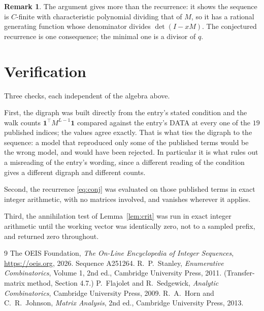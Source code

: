 \documentclass[11pt,a4paper]{article}
\theoremstyle{plain}
\theoremstyle{definition}
\newtheorem{remark}[theorem]{Remark}
\begin{document}
\begin{remark}
The argument gives more than the recurrence: it shows the sequence is $C$-finite with
characteristic polynomial dividing that of $M$, so it has a rational generating function
whose denominator divides $\det(I-xM)$. The conjectured recurrence is one consequence; the
minimal one is a divisor of $q$.
\end{remark}

\section{Verification}

Three checks, each independent of the algebra above.

First, the digraph was built directly from the entry's stated condition and the walk counts
$\mathbf{1}^{\!\top}M^{L-1}\mathbf{1}$ compared against the entry's DATA at
every one of the $19$ published indices; the values agree exactly. That is what ties
the digraph to the sequence: a model that reproduced only some of the published terms would
be the wrong model, and would have been rejected. In particular it is what rules out a
misreading of the entry's wording, since a different reading of the condition gives a
different digraph and different counts.

Second, the recurrence \eqref{eq:conj} was evaluated on those published terms in exact
integer arithmetic, with no matrices involved, and vanishes wherever it applies.

Third, the annihilation test of Lemma~\ref{lem:crit} was run in exact integer arithmetic
until the working vector was identically zero, not to a sampled prefix, and returned zero
throughout.

\begin{thebibliography}{9}
 The OEIS Foundation, \emph{The On-Line Encyclopedia of Integer
Sequences}, \url{https://oeis.org}, 2026. Sequence A251264.
 R.~P.~Stanley, \emph{Enumerative Combinatorics}, Volume 1, 2nd ed.,
Cambridge University Press, 2011. (Transfer-matrix method, Section 4.7.)
 P.~Flajolet and R.~Sedgewick, \emph{Analytic Combinatorics}, Cambridge
University Press, 2009.
 R.~A.~Horn and C.~R.~Johnson, \emph{Matrix Analysis}, 2nd ed., Cambridge
University Press, 2013.
\end{thebibliography}
\end{document}
